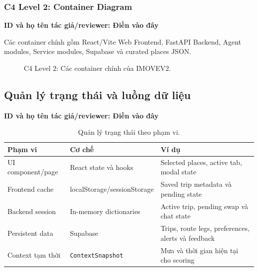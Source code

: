 \documentclass[12pt,a4paper]{article}
\newcommand{\tacgia}{%
  \begin{tcolorbox}[colback=blue!3,colframe=blue!25,boxrule=0.4pt,arc=1mm]
    \small\textbf{ID và họ tên tác giả/reviewer: Điền vào đây}
  \end{tcolorbox}
}
\begin{document}
\subsubsection{C4 Level 2: Container Diagram}
\tacgia
Các container chính gồm React/Vite Web Frontend, FastAPI Backend, Agent modules, Service modules, Supabase và curated places JSON.

\begin{figure}[H]
\centering
{}
\caption{C4 Level 2: Các container chính của IMOVEV2.}
\label{fig:c4-container}
\end{figure}

\subsection{Quản lý trạng thái và luồng dữ liệu}
\tacgia

\begin{table}[H]
\centering
\begin{tabularx}{\textwidth}{|L{3.2cm}|L{4.0cm}|X|}
\hline
\textbf{Phạm vi} & \textbf{Cơ chế} & \textbf{Ví dụ} \\ \hline
UI component/page & React state và hooks & Selected places, active tab, modal state \\ \hline
Frontend cache & localStorage/sessionStorage & Saved trip metadata và pending state \\ \hline
Backend session & In-memory dictionaries & Active trip, pending swap và chat state \\ \hline
Persistent data & Supabase & Trips, route legs, preferences, alerts và feedback \\ \hline
Context tạm thời & \texttt{ContextSnapshot} & Mưa và thời gian hiện tại cho scoring \\ \hline
\end{tabularx}
\caption{Quản lý trạng thái theo phạm vi.}
\label{tab:state-management}
\end{table}
\end{document}

